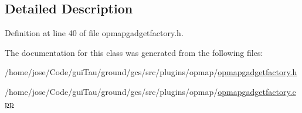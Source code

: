 \subsection{Detailed Description}


Definition at line 40 of file opmapgadgetfactory.\-h.



The documentation for this class was generated from the following files\-:\begin{DoxyCompactItemize}
\item 
/home/jose/\-Code/gui\-Tau/ground/gcs/src/plugins/opmap/\hyperlink{opmapgadgetfactory_8h}{opmapgadgetfactory.\-h}\item 
/home/jose/\-Code/gui\-Tau/ground/gcs/src/plugins/opmap/\hyperlink{opmapgadgetfactory_8cpp}{opmapgadgetfactory.\-cpp}\end{DoxyCompactItemize}
